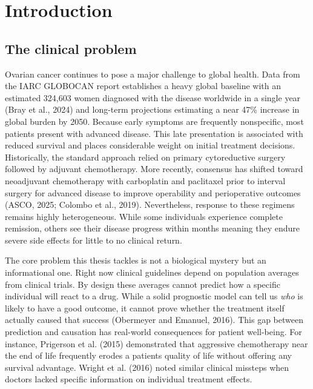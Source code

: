 \chapter{Introduction}\label{introduction}

\section{The clinical problem}\label{the-clinical-problem}

Ovarian cancer continues to pose a major challenge to global health. Data from the IARC GLOBOCAN report establishes a heavy global baseline with an estimated 324,603 women diagnosed with the disease worldwide in a single year (Bray et al., 2024) and long-term projections estimating a near 47\% increase in global burden by 2050. Because early symptoms are frequently nonspecific, most patients present with advanced disease. This late presentation is associated with reduced survival and places considerable weight on initial treatment decisions. Historically, the standard approach relied on primary cytoreductive surgery followed by adjuvant chemotherapy. More recently, consensus has shifted toward neoadjuvant chemotherapy with carboplatin and paclitaxel prior to interval surgery for advanced disease to improve operability and perioperative outcomes (ASCO, 2025; Colombo et al., 2019). Nevertheless, response to these regimens remains highly heterogeneous. While some individuals experience complete remission, others see their disease progress within months meaning they endure severe side effects for little to no clinical return.

The core problem this thesis tackles is not a biological mystery but an informational one. Right now clinical guidelines depend on population averages from clinical trials. By design these averages cannot predict how a specific individual will react to a drug. While a solid prognostic model can tell us \emph{who} is likely to have a good outcome, it cannot prove whether the treatment itself actually caused that success (Obermeyer and Emanuel, 2016). This gap between prediction and causation has real-world consequences for patient well-being. For instance, Prigerson et al. (2015) demonstrated that aggressive chemotherapy near the end of life frequently erodes a patient\textquotesingle s quality of life without offering any survival advantage. Wright et al. (2016) noted similar clinical missteps when doctors lacked specific information on individual treatment effects.

